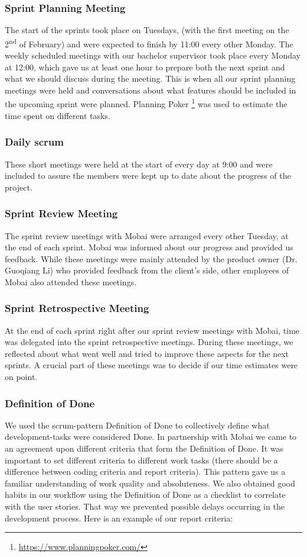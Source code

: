 \subsubsection*{Sprint Planning Meeting}
The start of the sprints took place on Tuesdays, (with the first meeting on the 2\textsuperscript{nd} of February) and were expected to finish by 11:00 every other Monday. The weekly scheduled meetings with our bachelor supervisor took place every Monday at 12:00, which gave us at least one hour to prepare both the next sprint and what we should discuss during the meeting. This is when all our sprint planning meetings were held and conversations about what features should be included in the upcoming sprint were planned. Planning Poker \footnote{\url{https://www.planningpoker.com/}} was used to estimate the time spent on different tasks.

\subsubsection*{Daily scrum}
These short meetings were held at the start of every day at 9:00 and were included to assure the members were kept up to date about the progress of the project.

\subsubsection*{Sprint Review Meeting}
The sprint review meetings with Mobai were arranged every other Tuesday, at the end of each sprint. Mobai was informed about our progress and provided us feedback. While these meetings were mainly attended by the product owner (Dr. Guoqiang Li) who provided feedback from the client's side, other employees of Mobai also attended these meetings. 
\subsubsection*{Sprint Retrospective Meeting}
At the end of each sprint right after our sprint review meetings with Mobai, time was delegated into the sprint retrospective meetings. During these meetings, we reflected about what went well and tried to improve these aspects for the next sprints. A crucial part of these meetings was to decide if our time estimates were on point. 

\subsubsection{Definition of Done}
\label{sec:DefinitionofDone}
We used the scrum-pattern Definition of Done \cite{DoneDone} to collectively define what development-tasks were considered Done. In partnership with Mobai we came to an agreement upon different criteria that form the Definition of Done. It was important to set different criteria to different work tasks (there should be a difference between coding criteria and report criteria). This pattern gave us a familiar understanding of work quality and absoluteness. We also obtained good habits in our workflow using the Definition of Done as a checklist to correlate with the user stories. That way we prevented possible delays occurring in the development process. Here is an example of our report criteria: 

